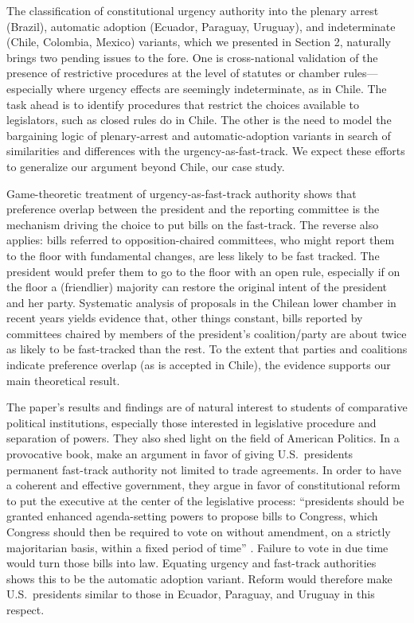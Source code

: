 \documentclass[letter,12pt]{article}
\begin{document}
The classification of constitutional urgency authority into the plenary arrest (Brazil), automatic adoption (Ecuador, Paraguay, Uruguay), and indeterminate (Chile, Colombia, Mexico) variants, which we presented in Section 2, naturally brings two pending issues to the fore. One is cross-national validation of the presence of restrictive procedures at the level of statutes or chamber rules---especially where urgency effects are seemingly indeterminate, as in Chile. The task ahead is to identify procedures that restrict the choices available to legislators, such as closed rules do in Chile. The other is the need to model the bargaining logic of plenary-arrest and automatic-adoption variants in search of similarities and differences with the urgency-as-fast-track. We expect these efforts to generalize our argument beyond Chile, our case study.

Game-theoretic treatment of urgency-as-fast-track authority shows that preference overlap between the president and the reporting committee is the mechanism driving the choice to put bills on the fast-track. The reverse also applies: bills referred to opposition-chaired committees, who might report them to the floor with fundamental changes, are less likely to be fast tracked. The president would prefer them to go to the floor with an open rule, especially if on the floor a (friendlier) majority can restore the original intent of the president and her party. Systematic analysis of proposals in the Chilean lower chamber in recent years yields evidence that, other things constant, bills reported by committees chaired by members of the president's coalition/party are about twice as likely to be fast-tracked than the rest. To the extent that parties and coalitions indicate preference overlap (as is accepted in Chile), the evidence supports our main theoretical result.

The paper's results and findings are of natural interest to students of comparative political institutions, especially those interested in legislative procedure and separation of powers. They also shed light on the field of American Politics. In a provocative book, \citet{howell.moe.Relic2016} make an argument in favor of giving U.S.\ presidents permanent fast-track authority not limited to trade agreements. In order to have a coherent and effective government, they argue in favor of constitutional reform to put the executive at the center of the legislative process: ``presidents should be granted enhanced agenda-setting powers to propose bills to Congress, which Congress should then be required to vote on without amendment, on a strictly majoritarian basis, within a fixed period of time'' \citep[][, 145]{howell.moe.Relic2016}. Failure to vote in due time would turn those bills into law. Equating urgency and fast-track authorities shows this to be the automatic adoption variant. Reform would therefore make U.S.\ presidents similar to those in Ecuador, Paraguay, and Uruguay in this respect. 
\end{document}
